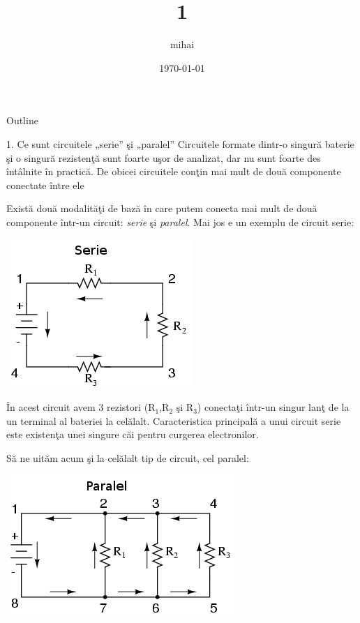 \documentclass[presentation]{beamer}
\author{mihai}
\date{\today}
\title{1}
\begin{document}
\maketitle
\begin{frame}{Outline}
\tableofcontents
\end{frame}

\begin{frame}[label=sec-1]{1. Ce sunt circuitele „serie” şi „paralel”}
Circuitele formate dintr-o singură baterie şi o singură rezistenţă sunt
foarte uşor de analizat, dar nu sunt foarte des întâlnite în practică.
De obicei circuitele conţin mai mult de două componente conectate între
ele

Există două modalităţi de bază în care putem conecta mai mult de două
componente într-un circuit: \emph{serie} şi \emph{paralel}. Mai jos e un exemplu
de circuit serie:

\includegraphics[width=.9\linewidth]{../poze/00082.png}

În acest circuit avem 3 rezistori (R$_{\text{1}}$,R$_{\text{2}}$ şi R$_{\text{3}}$) conectaţi
într-un singur lanţ de la un terminal al bateriei la celălalt.
Caracteristica principală a unui circuit serie este existenţa unei
singure căi pentru curgerea electronilor.

Să ne uităm acum şi la celălalt tip de circuit, cel paralel:

\includegraphics[width=.9\linewidth]{../poze/00083.png}


\end{frame}
\end{document}
